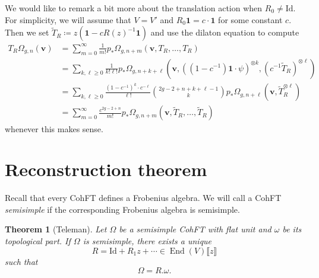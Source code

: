 \documentclass{amsart}
\newtheorem{thm}{Theorem}[section]
\theoremstyle{definition}
\theoremstyle{remark}
\theoremstyle{plain}
\theoremstyle{definition}
\theoremstyle{remark}
\newcommand{\mbf}[1]{\mathbf{#1}}
\newcommand{\bv}{\mbf{v}}
\newcommand{\mr}[1]{\mathrm{#1}}
\newcommand{\1}{\mathbf{1}}
\newcommand{\2}{\mathbf{2}}
\newcommand{\3}{\mathbf{3}}
\newcommand{\ps}[1]{\llbracket #1 \rrbracket}
\DeclareMathOperator{\End}{End}
\begin{document}
We would like to remark a bit more about the translation action when $R_0 \neq \mr{Id}$. For simplicity, we will assume that $V = V'$ and $R_0 \1 = c \cdot \1$ for some constant $c$. Then we set $\tilde{T}_R \coloneqq z( \1 - c R(z)^{-1} \1)$ and use the dilaton equation to compute
\begin{align*}
    T_R \Omega_{g,n}(\bv) &= \sum_{m=0}^{\infty} \frac{1}{m!} p_*\Omega_{g,n+m}(\bv, T_R, \ldots, T_R) \\
    &= \sum_{k,\ell \geq 0} \frac{1}{k!\ell!} p_* \Omega_{g,n+k+\ell}(\bv, ( (1-c^{-1})\1 \cdot \psi )^{\otimes k}, ( c^{-1} \tilde{T}_R )^{\otimes \ell}) \\
    &= \sum_{k,\ell \geq 0} \frac{(1-c^{-1})^k \cdot c^{-\ell}}{\ell!} \binom{2g-2+n+k+\ell-1}{k} p_* \Omega_{g,n+\ell}(\bv, \tilde{T}_R^{\otimes \ell}) \\
    &= \sum_{m=0}^{\infty} \frac{c^{2g-2+n}}{m!} p_* \Omega_{g,n+m}(\bv, \tilde{T}_R, \ldots, \tilde{T}_R)
\end{align*}
whenever this makes sense.


\section{Reconstruction theorem}%
\label{sec:Reconstruction theorem}

Recall that every CohFT defines a Frobenius algebra. We will call a CohFT \textit{semisimple} if the corresponding Frobenius algebra is semisimple.

\begin{thm}[Teleman]
    Let $\Omega$ be a semisimple CohFT with flat unit and $\omega$ be its topological part. If $\Omega$ is semisimple, there exists a unique 
    \[ R = \mr{Id} + R_1 z + \cdots \in \End(V)\ps{z} \]
    such that
    \[ \Omega = R.\omega. \]
\end{thm}
\end{document}
